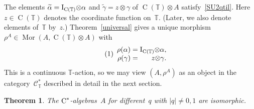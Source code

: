 \documentclass[a4paper]{amsart}
\numberwithin{equation}{section}
\newtheorem{Thm}{Theorem}[section]
\theoremstyle{definition}
\theoremstyle{remark}
\begin{document}
The elements ${{\widetilde \alpha}}={\textup{I}}_{\operatorname{C}(\mathbb{T})}{\otimes} \alpha$ and
${{\widetilde\gamma}}=z{\otimes}\gamma$ of $\operatorname{C}(\mathbb{T}){\otimes}{{A}}$
satisfy~\eqref{SU2qtil}.  Here $z\in\operatorname{C}(\mathbb{T})$ denotes the
coordinate function on~$\mathbb{T}$.  (Later, we also denote
elements of~\(\mathbb{T}\) by~\(z\).)  Theorem~\ref{universal} gives
a unique morphism
$\rho^A\in{\operatorname{Mor}}({{A}},\operatorname{C}(\mathbb{T}){\otimes}{{A}})$ with
\[
{\label{{rho}}\stepcounter{equation}\tag{\theequation}}
\begin{array}{r@{\;=\;}r}
\rho(\alpha)&{\textup{I}}_{\operatorname{C}(\mathbb{T})}{\otimes}\alpha,\\
\rho(\gamma)&z{\otimes}\gamma.
\end{array}
\]
This is a continuous \(\mathbb{T}\){\nobreakdash}-action, so we may view
$(A,\rho^A)$ as an object in the category~$\mathcal{C}^*_{\mathbb{T}}$
described in detail in the next section.

\begin{Thm}
  \label{the:compare_q}
  The ${\textup{C}^*}${\nobreakdash}-algebras~${{A}}$ for different~\(q\) with
  \({\left|{q}\right|}\neq0,1\) are isomorphic.
\end{Thm}
\end{document}
